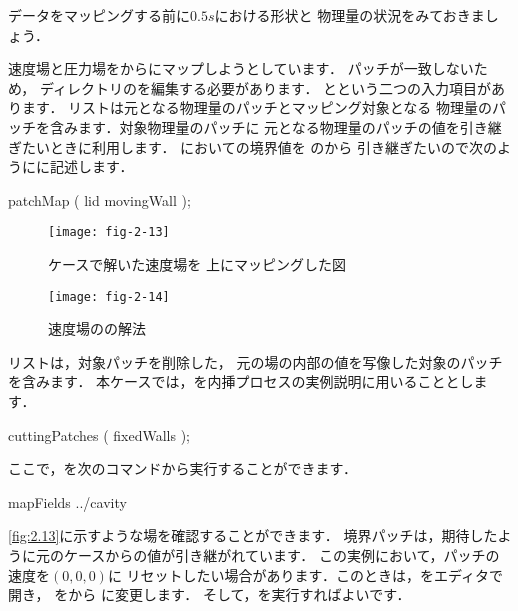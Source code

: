 データをマッピングする前に$0.5\unit{s}$における形状と
物理量の状況をみておきましょう．

速度場と圧力場をからにマップしようとしています．
パッチが一致しないため，
ディレクトリのを編集する必要があります．
とという二つの入力項目があります．
リストは元となる物理量のパッチとマッピング対象となる
物理量のパッチを含みます．対象物理量のパッチに
元となる物理量のパッチの値を引き継ぎたいときに利用します．
においての境界値を
のから
引き継ぎたいので次のようにに記述します．
\begin{OFverbatim}[file]
patchMap
(
   lid movingWall
);
\end{OFverbatim}


\begin{figure}[ht]
 \texttt{[image: fig-2-13]}
 \caption{ケースで解いた速度場を
 上にマッピングした図}
 \label{fig:2.13}
\end{figure}


\begin{figure}[ht]
 \texttt{[image: fig-2-14]}
 \caption{速度場のの解法}
 \label{fig:2.14}
\end{figure}


リストは，対象パッチを削除した，
元の場の内部の値を写像した対象のパッチを含みます．
本ケースでは，を内挿プロセスの実例説明に用いることとします．
\begin{OFverbatim}[file]
cuttingPatches
(
  fixedWalls
);
\end{OFverbatim}
ここで，を次のコマンドから実行することができます．
\begin{OFverbatim}[terminal]
mapFields ../cavity
\end{OFverbatim}
\autoref{fig:2.13}に示すような場を確認することができます．
境界パッチは，期待したように元のケースからの値が引き継がれています．
この実例において，パッチの速度を$(0, 0, 0)$に
リセットしたい場合があります．このときは，をエディタで開き，
をから
に変更します．
そして，を実行すればよいです．


